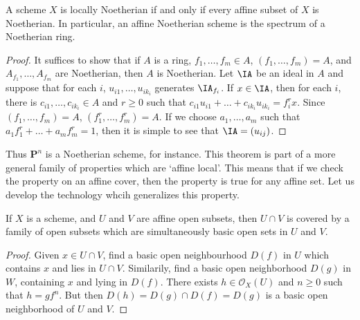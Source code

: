 \begin{theorem}
    A scheme $X$ is locally Noetherian if and only if every affine subset of $X$ is Noetherian. In particular, an affine Noetherian scheme is the spectrum of a Noetherian ring.
\end{theorem}
\begin{proof}
    It suffices to show that if $A$ is a ring, $f_1,\dots,f_m \in A$, $(f_1,\dots,f_m) = A$, and $A_{f_1},\dots, A_{f_m}$ are Noetherian, then $A$ is Noetherian. Let $\IA$ be an ideal in $A$ and suppose that for each $i$, $u_{i1},\dots,u_{ik_i}$ generates $\IA_{f_i}$. If $x \in \IA$, then for each $i$, there is $c_{i1}, \dots, c_{ik_i} \in A$ and $r \geq 0$ such that $c_{i1} u_{i1} + \dots + c_{ik_i} u_{ik_i} = f_i^r x$. Since $(f_1,\dots,f_m) = A$, $(f_1^r, \dots, f_m^r) = A$. If we choose $a_1,\dots,a_m$ such that $a_1 f_1^r + \dots + a_m f_m^r = 1$, then it is simple to see that $\IA = (u_{ij})$.
\end{proof}

Thus $\mathbf{P}^n$ is a Noetherian scheme, for instance. This theorem is part of a more general family of properties which are `affine local'. This means that if we check the property on an affine cover, then the property is true for any affine set. Let us develop the technology whcih generalizes this property.

\begin{lemma}
    If $X$ is a scheme, and $U$ and $V$ are affine open subsets, then $U \cap V$ is covered by a family of open subsets which are simultaneously basic open sets in $U$ and $V$.
\end{lemma}
\begin{proof}
    Given $x \in U \cap V$, find a basic open neighbourhood $D(f)$ in $U$ which contains $x$ and lies in $U \cap V$. Similarily, find a basic open neighborhood $D(g)$ in $W$, containing $x$ and lying in $D(f)$. There exists $h \in \mathcal{O}_X(U)$ and $n \geq 0$ such that $h = gf^n$. But then $D(h) = D(g) \cap D(f) = D(g)$ is a basic open neighborhood of $U$ and $V$.
\end{proof}

